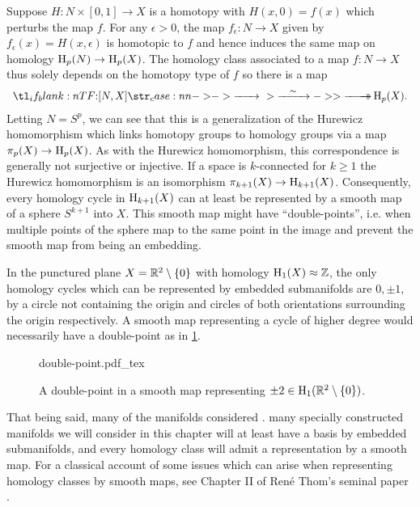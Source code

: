 Suppose $H : N\times [0,1] \to X$ is a homotopy with $H(x,0)=f(x)$ which perturbs the map $f$. For any $\epsilon>0$, the map $f_\epsilon : N \to X$ given by $f_\epsilon(x)=H(x,\epsilon)$ is homotopic to $f$ and hence induces the same map on homology $\operatorname{H}_p(N)\to \operatorname{H}_p(X)$. The homology class associated to a map $f : N \to X$ thus solely depends on the homotopy type of $f$ so there is a map
\begin{equation}
	\lkxfunc{}{[N,X]}{\H_p(X).}
\end{equation}
Letting $N=S^p$, we can see that this is a generalization of the Hurewicz homomorphism which links homotopy groups to homology groups via a map $\pi_p(X) \to \operatorname{H}_p(X)$.
As with the Hurewicz homomorphism, this correspondence is generally not surjective or injective. If a space is $k$-connected for $k\geq 1$ the Hurewicz homomorphism is an isomorphism $\pi_{k+1}(X) \to \operatorname{H}_{k+1}(X)$. Consequently, every homology cycle in $\operatorname{H}_{k+1}(X)$ can at least be represented by a smooth map of a sphere $S^{k+1}$ into $X$. This smooth map might have ``double-points'', i.e. when multiple points of the sphere map to the same point in the image and prevent the smooth map from being an embedding.

\begin{example}
	In the punctured plane $X=\mathbb{R}^2\setminus \{0\}$ with homology $\operatorname{H}_1(X)\approx \mathbb{Z}$, the only homology cycles which can be represented by embedded submanifolds are $0,\pm 1$, by a circle not containing the origin and circles of both orientations surrounding the origin respectively. A smooth map representing a cycle of higher degree would necessarily have a double-point as in \cref{fig:double-point}.
\end{example}

\begin{figure}[ht]
	\centering
	{double-point.pdf_tex}
	\caption{A double-point in a smooth map representing $\pm 2\in \operatorname{H}_1(\mathbb{R}^2\setminus\{0\})$.}\label{fig:double-point}
\end{figure}

That being said, many of the manifolds considered .
many specially constructed manifolds we will consider in this chapter will at least have a basis by embedded submanifolds, and every homology class will admit a representation by a smooth map. For a classical account of some issues which can arise when representing homology classes by smooth maps, see Chapter II of Ren\'e Thom's seminal paper \cite{thom1954}.

